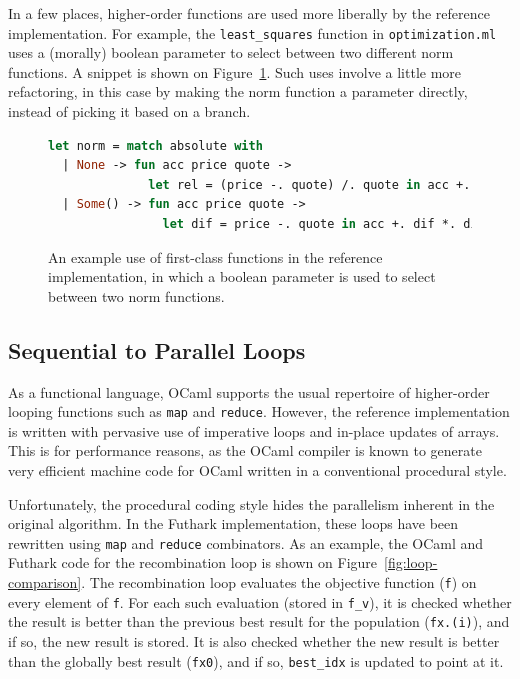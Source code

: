 \documentclass{article}
\begin{document}
In a few places, higher-order functions are used more liberally by the
reference implementation.  For example, the \texttt{least\_squares}
function in \texttt{optimization.ml} uses a (morally) boolean
parameter to select between two different norm functions.  A snippet
is shown on Figure~\ref{fig:fcf-example}.  Such uses involve a little
more refactoring, in this case by making the norm function a parameter
directly, instead of picking it based on a branch.

\begin{figure}
  \centering
\begin{lstlisting}[language=Caml]
let norm = match absolute with
  | None -> fun acc price quote ->
              let rel = (price -. quote) /. quote in acc +. rel *. rel
  | Some() -> fun acc price quote ->
                let dif = price -. quote in acc +. dif *. dif
\end{lstlisting}
  \caption{An example use of first-class functions in the reference
    implementation, in which a boolean parameter is used to
    select between two norm functions.}
  \label{fig:fcf-example}
\end{figure}

\subsection{Sequential to Parallel Loops}

As a functional language, OCaml supports the usual repertoire of
higher-order looping functions such as \texttt{map} and
\texttt{reduce}.  However, the reference implementation is written
with pervasive use of imperative loops and in-place updates of arrays.
This is for performance reasons, as the OCaml compiler is known to
generate very efficient machine code for OCaml written in a
conventional procedural style.

Unfortunately, the procedural coding style hides the parallelism
inherent in the original algorithm.  In the Futhark implementation,
these loops have been rewritten using \texttt{map} and \texttt{reduce}
combinators.  As an example, the OCaml and Futhark code for the
recombination loop is shown on Figure~\ref{fig:loop-comparison}.  The
recombination loop evaluates the objective function (\texttt{f}) on
every element of \texttt{f}.  For each such evaluation (stored in
\texttt{f\_v}), it is checked whether the result is better than the
previous best result for the population (\texttt{fx.(i)}), and if so,
the new result is stored.  It is also checked whether the new result
is better than the globally best result (\texttt{fx0}), and if so,
\texttt{best\_idx} is updated to point at it.
\end{document}
